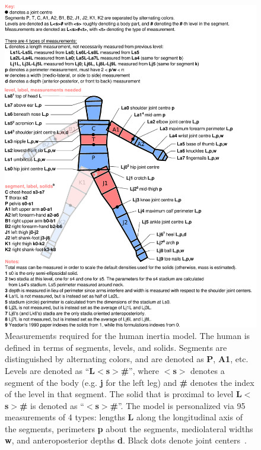 \documentclass[10pt,a4paper,twocolumn]{article}
\begin{document}
\begin{figure}
  \begin{center}
    \includegraphics[width=1.6\columnwidth]{figures/measurements.pdf}
  \end{center}
  \caption{
    Measurements required for the human inertia model. The human is defined in
    terms of segments, levels, and solids. Segments are distinguished by
    alternating colors, and are denoted as \textbf{P}, \textbf{A1}, etc. Levels
    are denoted as ``\textbf{L$<$s$>$\#}'', where \textbf{$<$s$>$} denotes a
    segment of the body (e.g. \textbf{j} for the left leg) and \textbf{\#}
    denotes the index of the level in that segment. The solid that is proximal
    to level \textbf{L$<$s$>$\#} is denoted as ``\textbf{$<$s$>$\#}''. The
    model is personalized via 95 measurements of 4 types: lengths \textbf{L}
    along the longitudinal axis of the segments, perimeters \textbf{p} about
    the segments, mediolateral widths \textbf{w}, and anteroposterior depths
    \textbf{d}. Black dots denote joint centers~\cite{Yeadon1990c}.
  }
  \label{fig:meas}
\end{figure}
\end{document}
